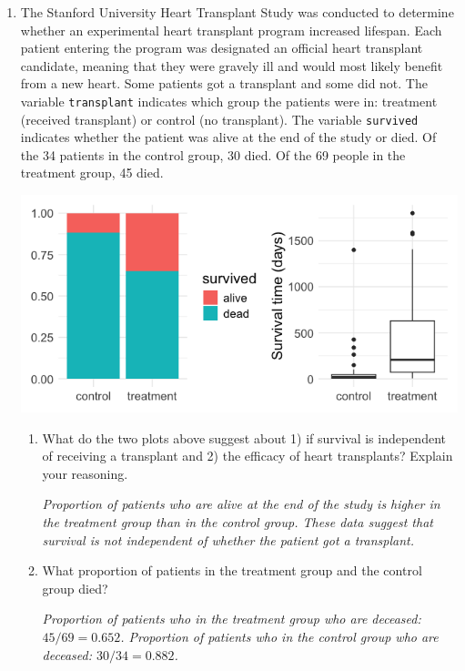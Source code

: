 \documentclass[12pt]{article}   	%
\newcommand{\soln}[2]{\textit{\textcolor{custom_red}{#2}}}{}
\begin{document}
 \begin{enumerate}
\item
  The Stanford University Heart Transplant Study was conducted to
  determine whether an experimental heart transplant program increased
  lifespan. Each patient entering the program was designated an official
  heart transplant candidate, meaning that they were gravely ill and
  would most likely benefit from a new heart. Some patients got a
  transplant and some did not. The variable \texttt{transplant}
  indicates which group the patients were in: treatment (received
  transplant) or control (no transplant). The variable \texttt{survived}
  indicates whether the patient was alive at the end of the study or
  died. Of the 34 patients in the control group, 30 died. Of the 69
  people in the treatment group, 45 died.

  \includegraphics[scale = 0.4]{images/14-heart-transplant-eda.png}

  \begin{enumerate}
  \item
    What do the two plots above suggest about 1) if survival is
    independent of receiving a transplant and 2) the efficacy of heart
    transplants? Explain your reasoning.
    
    \soln{}{Proportion of patients who are alive at the end of the study is higher in the treatment
group than in the control group. These data suggest that survival is not independent
of whether the patient got a transplant.}
    
   
  \item
    What proportion of patients in the treatment group and the control
    group died?
    
    \soln{}{Proportion of patients who in the treatment group who are deceased: $45/69 = 0.652$.
Proportion of patients who in the control group who are deceased: $30/34 = 0.882$.}


\end{enumerate}
\end{enumerate}
\end{document}
